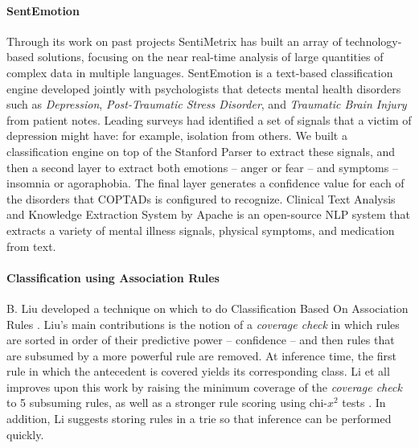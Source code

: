 \paragraph{SentEmotion} 
Through its work on past projects \cite{dickerson14,kagan15,darpa} SentiMetrix has built an array of technology-based solutions, focusing on the near real-time analysis of large quantities of complex data in multiple languages. SentEmotion \cite{coptads,coptads-book} is a text-based classification engine developed jointly with psychologists that detects mental health disorders such as \textit{Depression}, \textit{Post-Traumatic Stress Disorder}, and \textit{Traumatic Brain Injury} from patient notes. Leading surveys had identified a set of signals that a victim of depression might have: for example, isolation from others. We built a classification engine on top of the Stanford Parser \cite{stanfordparser} to extract these signals, and then a second layer to extract both emotions -- anger or fear -- and symptoms -- insomnia or agoraphobia. The final layer generates a confidence value for each of the disorders that COPTADs is configured to recognize. Clinical Text Analysis and Knowledge Extraction System \cite{ctakes} by Apache is an open-source NLP system that extracts a variety of mental illness signals, physical symptoms, and medication from text.

\paragraph{Classification using Association Rules} B. Liu developed a technique on which to do Classification Based On Association Rules \cite{cba}. Liu's main contributions is the notion of a \textit{coverage check} in which rules are sorted in order of their predictive power -- confidence -- and then rules that are subsumed by a more powerful rule are removed. At inference time, the first rule in which the antecedent is covered yields its corresponding class. Li et all improves upon this work by raising the minimum coverage of the \textit{coverage check} to 5 subsuming rules, as well as a stronger rule scoring using chi-$x^2$ tests \cite{cmar}. In addition, Li suggests storing rules in a trie so that inference can be performed quickly. 

